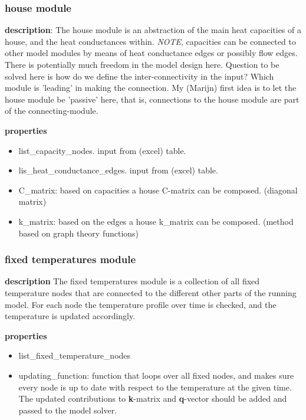\subsubsection{house module}
\textbf{description}: The house module is an abstraction of the main heat capacities of a house, and the heat conductances within. \emph{NOTE}, capacities can be connected to other model modules by means of heat conductance edges or possibly flow edges. There is potentially much freedom in the model design here. Question to be solved here is how do we define the inter-connectivity in the input? Which module is 'leading' in making the connection. My (Marijn) first idea is to let the house module be 'passive' here, that is, connections to the house module are part of the connecting-module.    

\textbf{properties}
\begin{itemize}
	\item list\_capacity\_nodes. input from (excel) table.
	\item lis\_heat\_conductance\_edges. input from (excel) table.
	\item C\_matrix: based on capacities a house C-matrix can be composed. (diagonal matrix)
	\item k\_matrix: based on the edges a house k\_matrix can be composed. (method based on graph theory functions)
\end{itemize}

\subsubsection{fixed temperatures module}
\textbf{description} The fixed temperatures module is a collection of all fixed temperature nodes that are connected to the different other parts of the running model. For each node the temperature profile over time is checked, and the temperature is updated accordingly. 

\textbf{properties}
\begin{itemize}
	\item list\_fixed\_temperature\_nodes
	\item updating\_function: function that loops over all fixed nodes, and makes sure every node is up to date with respect to the temperature at the given time. The updated contributions to \textbf{k}-matrix and \textbf{q}-vector should be added and passed to the model solver. 
\end{itemize}

